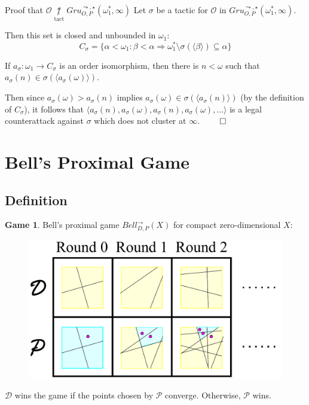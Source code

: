 \documentclass{beamer}
\theoremstyle{definition}
\newtheorem{game}[theorem]{Game}
\newcommand{\nottactwin}{\underset{\text{tact}}{\not\uparrow}}
\newcommand{\oneptcomp}[1]{#1^*}
\newcommand{\gruClusGameHard}[2]{Gru_{O,P}^{\leadsto,\star}\left({#1},{#2}\right)}
\newcommand{\bellAbsConGame}[1]{Bell_{D,P}^{\to}\left({#1}\right)}
\newcommand{\<}{\langle}
\renewcommand{\>}{\rangle}
\newcommand{\pl}[1]{\mathscr{#1}}
\begin{document}
\begin{frame}{
  Proof that $\pl O\nottactwin\gruClusGameHard{\oneptcomp\omega_1}{\infty}$
}\small
  Let $\sigma$ be a tactic for $\pl O$ in
  $\gruClusGameHard{\oneptcomp\omega_1}{\infty}$.

  \vpause

  Then this set is closed and unbounded in $\omega_1$:
    \[
      C_\sigma
        =
      \{
        \alpha<\omega_1
          :
        \beta<\alpha
          \Rightarrow
        \oneptcomp\omega_1\setminus\sigma(\<\beta\>)
        \subseteq \alpha
      \}
    \]

  \vpause

  If $a_\sigma:\omega_1\to C_\sigma$ is an order isomorphism, then
  there is $n<\omega$ such that $a_\sigma(n)\in\sigma(\<a_\sigma(\omega)\>)$.

  \vpause

  Then since $a_\sigma(\omega)>a_\sigma(n)$ implies
  $a_\sigma(\omega)\in\sigma(\<a_\sigma(n)\>)$
  (by the definition of $C_\sigma$), it follows that
  $\<a_\sigma(n),a_\sigma(\omega),a_\sigma(n),a_\sigma(\omega),\dots\>$
  is a legal counterattack against $\sigma$ which does not cluster at
  $\infty$. $\qed$
\end{frame}




\section{Bell's Proximal Game}

\subsection{Definition}

\begin{frame}
  \small
  \begin{game}
  Bell's proximal game $\bellAbsConGame{X}$ for compact zero-dimensional
  $X$:
    \begin{figure}
      \includegraphics[width=0.6\linewidth]{proximalGameAlt.pdf}
    \end{figure}

  $\pl D$ wins the game if the points chosen by $\pl P$ converge.
  Otherwise, $\pl P$ wins.
  \end{game}
\end{frame}
\end{document}
